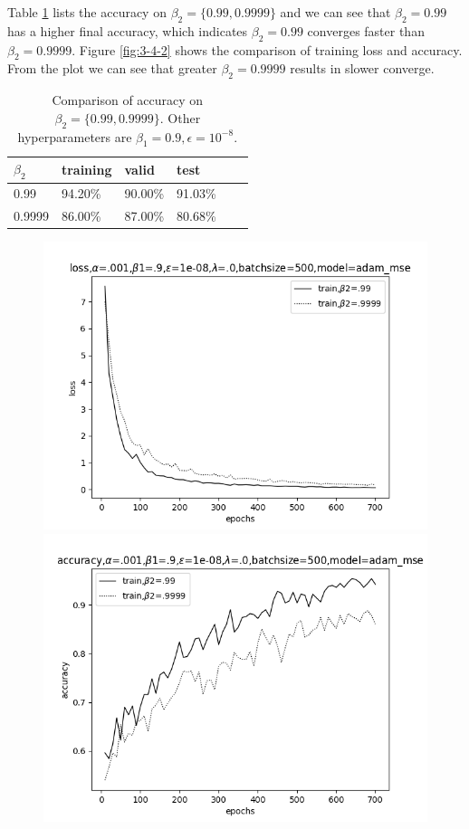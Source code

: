 \documentclass[12pt]{article}
\newenvironment{problem}[2][Problem]{\begin{trivlist}
\item[\hskip \labelsep {\bfseries #1}\hskip \labelsep {\bfseries #2.}]}{\end{trivlist}}
\begin{document}
\begin{problem}{3}
Table \ref{table:3-4-b} lists the accuracy on $\beta_2=\{0.99, 0.9999\}$ and we can see that $\beta_2=0.99$ has a higher final accuracy, which indicates $\beta_2=0.99$ converges faster than $\beta_2=0.9999$. Figure \ref{fig:3-4-2} shows the comparison of training loss and accuracy. From the plot we can see that greater $\beta_2=0.9999$ results in slower converge.


\begin{table}[!htb]
\center
\begin{tabular}{|l|l|l|l|l|l|}
\hline
$\beta_2$ & training & valid   & test     \\ \hline
0.99      & 94.20\%  & 90.00\% & 91.03\%  \\ \hline
0.9999    & 86.00\%  & 87.00\% & 80.68\%  \\ \hline
\end{tabular}
\caption{Comparison of accuracy on $\beta_2=\{0.99, 0.9999\}$. Other hyperparameters are $\beta_1=0.9, \epsilon=10^{-8}$.}
\label{table:3-4-b}
\end{table}

\begin{figure}[!htb]
  \includegraphics[width=\linewidth]{images/a1/3.4/b/train_loss.png}
\endminipage\hfill
{}
  \includegraphics[width=\linewidth]{images/a1/3.4/b/train_accuracy.png}
\endminipage


\end{figure}
\end{problem}
\end{document}
